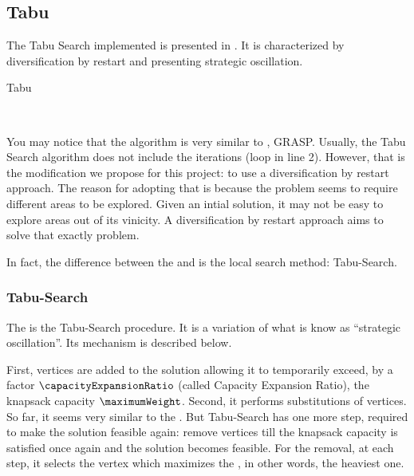 \subsection{Tabu}

The Tabu Search implemented is presented in \cite{bib:tabu}. It is characterized by diversification by restart and presenting strategic oscillation.

\begin{algorithm}[H]
    \caption{Tabu}
    \begin{algorithmic}[1]
        \Require{$\nit, \greedyParameter$}
            \EndIf
        \EndFor
        \\
    \end{algorithmic}
    \label{algorithm:tabu}
\end{algorithm}

You may notice that the algorithm is very similar to , GRASP. Usually, the Tabu Search algorithm does not include the iterations (loop in line 2). However, that is the modification we propose for this project: to use a diversification by restart approach. The reason for adopting that is because the problem seems to require different areas to be explored. Given an intial solution, it may not be easy to explore areas out of its vinicity. A diversification by restart approach aims to solve that exactly problem.

In fact, the difference between the  and  is the local search method: Tabu-Search.

\subsubsection{Tabu-Search}

The  is the Tabu-Search procedure. It is a variation of what is know as ``strategic oscillation''. Its mechanism is described below.

First, vertices are added to the solution allowing it to  temporarily exceed, by a factor $\capacityExpansionRatio$ (called Capacity Expansion Ratio), the knapsack capacity $\maximumWeight$. Second, it performs substitutions of vertices. So far, it seems very similar to the . But Tabu-Search has one more step, required to make the solution feasible again: remove vertices till the knapsack capacity is satisfied once again and the solution becomes feasible. For the removal, at each step, it selects the vertex which maximizes the \greedyCriteriaText, in other words, the heaviest one.

